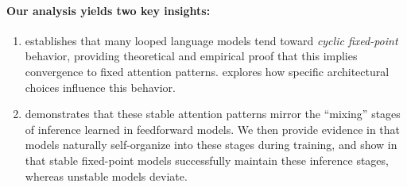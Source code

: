 \begin{tcolorbox}[colback=orange!10,
leftrule=0.5mm,top=1mm,bottom=1mm,boxrule=0.6pt]
\paragraph{Our analysis yields two key insights:}
\begin{enumerate}
    \item {} establishes that many looped language models tend toward \emph{cyclic fixed-point} behavior, providing theoretical and empirical proof that this implies convergence to fixed attention patterns.  explores how specific architectural choices influence this behavior.
    \item {} demonstrates that these stable attention patterns mirror the ``mixing'' stages of inference learned in feedforward models. We then provide evidence in  that models naturally self-organize into these stages during training, and show in  that stable fixed-point models successfully maintain these inference stages, whereas unstable models deviate.
\end{enumerate}
\end{tcolorbox}


